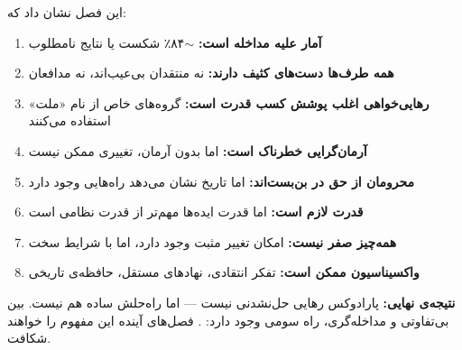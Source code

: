 \begin{tcolorbox}[mybox, title={خلاصه‌ی فصل}]
این فصل نشان داد که:
\begin{enumerate}
\item \textbf{آمار علیه مداخله است:} $\sim$۸۴٪ شکست یا نتایج نامطلوب
\item \textbf{همه طرف‌ها دست‌های کثیف دارند:} نه منتقدان بی‌عیب‌اند، نه مدافعان
\item \textbf{رهایی‌خواهی اغلب پوشش کسب قدرت است:} گروه‌های خاص از نام «ملت»
استفاده می‌کنند
\item \textbf{آرمان‌گرایی خطرناک است:} اما بدون آرمان، تغییری ممکن نیست
\item \textbf{محرومان از حق در بن‌بست‌اند:} اما تاریخ نشان می‌دهد
راه‌هایی وجود دارد
\item \textbf{قدرت لازم است:} اما قدرت ایده‌ها مهم‌تر از قدرت نظامی است
\item \textbf{همه‌چیز صفر نیست:} امکان تغییر مثبت وجود دارد، اما با
شرایط سخت
\item \textbf{واکسیناسیون ممکن است:} تفکر انتقادی، نهادهای مستقل،
حافظه‌ی تاریخی
\end{enumerate}

\textbf{نتیجه‌ی نهایی:} پارادوکس رهایی حل‌نشدنی نیست — اما راه‌حلش ساده
هم نیست. بین بی‌تفاوتی و مداخله‌گری، راه سومی وجود دارد:
. فصل‌های آینده این مفهوم را خواهند شکافت.
\end{tcolorbox}

\cleardoublepage